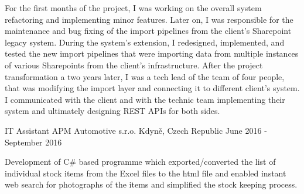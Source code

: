 \begin{cventries}
{\begin{cvitems}
{				For the first months of the project, I was working on the overall system refactoring and implementing minor features.
				Later on, I was responsible for the maintenance and bug fixing of the import pipelines from the client's Sharepoint legacy system.
				During the system's extension, I redesigned, implemented, and tested the new import pipelines that were importing data 
				from multiple instances of various Sharepoints from the client's infrastructure.
				\newline
				After the project transformation a two years later, I was a tech lead of the team of four people, 
				that was modifying the import layer and connecting it to different client's system. 
				I communicated with the client and with the technic team implementing their system and ultimately designing REST APIs for both sides.
			}
		\end{cvitems}
	}
	
	\cventry
	{IT Assistant}
	{APM Automotive s.r.o.}
	{Kdyně, Czech Republic}
	{June 2016 - September 2016}
	{
		\begin{cvitems}
			\item {
				Development of C\# based programme which exported/converted the list of individual stock items from the Excel files
			 	to the html file and enabled instant web search for photographs of the items and simplified the stock keeping process.
			 }
		\end{cvitems}
	}
			
\end{cventries}